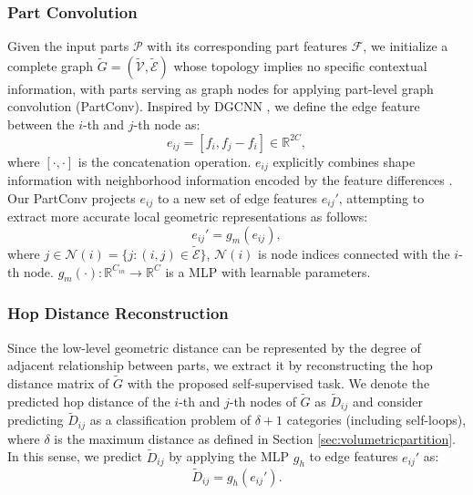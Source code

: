 \documentclass[letterpaper]{article} %
\begin{document}
\subsubsection{Part Convolution}
Given the input parts \(\mathcal{P}\) with its corresponding part features \(\mathcal{F}\), we initialize a complete graph  \(\tilde{G}=(\tilde{\mathcal{V}}, \tilde{\mathcal{E}})\) whose topology implies no specific contextual information, with parts serving as graph nodes for applying part-level graph convolution (PartConv).
Inspired by DGCNN \cite{dgcnn}, we define the edge feature between the \(i\)-th and \(j\)-th node as:
\begin{equation}
    e_{i j}=\left[f_{i}, f_{j}-f_{i}\right] \in \mathbb{R}^{2C},
\end{equation}
where \([\cdot, \cdot]\) is the concatenation operation.
\(e_{i j}\) explicitly combines shape information with neighborhood information encoded by the feature differences \cite{dgcnn}.
Our PartConv projects \(e_{ij}\) to a new set of edge features \(e_{ij}'\), attempting to extract more accurate local geometric representations \cite{adaptconv} as follows:
\begin{equation}
e_{i j}'=g_{m}\left(e_{ij}\right),
\end{equation}
where \(j \in \mathcal{N}(i) =\{j:(i, j) \in \tilde{\mathcal{E}}\}\), \(\mathcal{N}(i)\) is node indices connected with the \(i\)-th node.
\(g_m(\cdot): \mathbb{R}^{C_{in}} \rightarrow \mathbb{R}^{C}\) is a MLP with learnable parameters.



\subsubsection{Hop Distance Reconstruction}
Since the low-level geometric distance can be represented by the degree of adjacent relationship between parts, we extract it by reconstructing the hop distance matrix of \(\tilde{G}\) with the proposed self-supervised task.
We denote the predicted hop distance of the \(i\)-th and \(j\)-th nodes of \(\tilde{G}\) as \(\tilde{D}_{i j}\) and consider predicting \(\tilde{D}_{i j}\) as a classification problem of \(\delta + 1\) categories (including self-loops), where \(\delta\) is the maximum distance as defined in Section \ref{sec:volumetricpartition}.
In this sense, we predict \(\tilde{D}_{ij}\) by applying the MLP \(g_h\) to edge features \(e_{i j}'\) as:
\begin{equation}
    \tilde{D}_{i j} = g_h(e_{i j}'). %
\end{equation}
\end{document}
